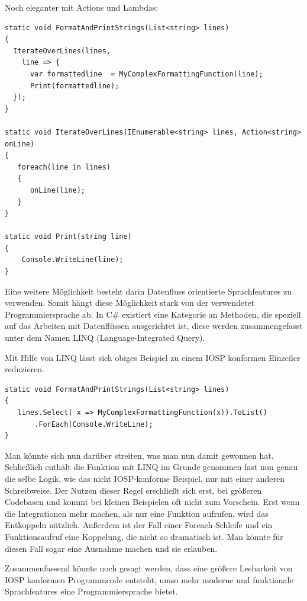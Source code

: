 Noch eleganter mit Actions und Lambdas:

\begin{lstlisting}[caption=FormatAndPrintStrings Variante 3]
static void FormatAndPrintStrings(List<string> lines)
{
  IterateOverLines(lines,
    line => {
      var formattedline  = MyComplexFormattingFunction(line);
      Print(formattedline);
  });
}

static void IterateOverLines(IEnumerable<string> lines, Action<string> onLine)
{
   foreach(line in lines)
   {
      onLine(line);
   }
}

static void Print(string line)
{
    Console.WriteLine(line);
}
\end{lstlisting}


Eine weitere Möglichkeit besteht darin Datenfluss orientierte Sprachfeatures zu verwenden.
Somit hängt diese Möglichkeit stark von der verwendetet Programmiersprache ab.
In C\# existiert eine Kategorie an Methoden, die speziell auf das Arbeiten mit Datenflüssen ausgerichtet ist, diese werden
zusammengefasst unter dem Namen LINQ (Language-Integrated Query).

\bigskip
Mit Hilfe von LINQ lässt sich obiges Beispiel zu einem IOSP konformen Einzeiler reduzieren.

\begin{lstlisting}[caption=FormatAndPrintStrings Variante LINQ]
static void FormatAndPrintStrings(List<string> lines)
{
   lines.Select( x => MyComplexFormattingFunction(x)).ToList()
	   .ForEach(Console.WriteLine);
}
\end{lstlisting}

Man könnte sich nun darüber streiten, was man nun damit gewonnen hat. Schließlich enthält die Funktion mit LINQ im Grunde
genommen fast nun genau die selbe Logik, wie das nicht IOSP-konforme Beispiel, nur mit einer anderen Schreibweise.
Der Nutzen dieser Regel erschließt sich erst, bei größeren Codebasen und kommt bei kleinen Beispielen oft nicht zum Vorschein.
Erst wenn die Integrationen mehr machen, als nur eine Funktion aufrufen, wird das Entkoppeln nützlich.
Außerdem ist der Fall einer Foreach-Schleife und ein Funktionsaufruf eine Koppelung, die nicht so dramatisch ist. Man
könnte für diesen Fall sogar eine Ausnahme machen und sie erlauben.


Zusammenfassend könnte noch gesagt werden, dass eine größere Lesbarkeit von IOSP konformen Programmcode entsteht, umso mehr moderne und funktionale
Sprachfeatures eine Programmiersprache bietet.

